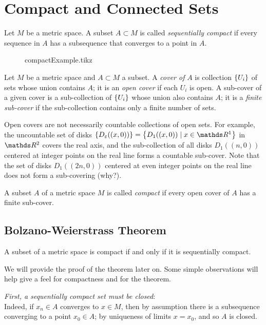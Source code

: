 \documentclass[../main-sheet.tex]{subfiles}
\begin{document}
\chapter{Compact and Connected Sets}
\begin{defn}
    Let $ M $ be a metric space. A subset $ A\subset M $ is called \emph{sequentially compact} if every sequence in $ A $ has a subsequence that converges to a point in $ A $.
\end{defn}
\begin{figure}[H]
    \centering
    {compactExample.tikz}
\end{figure}
\begin{defn}
    Let $ M $ be a metric space and $ A\subset M $ a subset. A \emph{cover of } $ A $ is collection $ \left\{U_i\right\} $ of sets whose union contains $ A $; it is an \emph{open cover} if each $ U_i $ is open. A sub-cover of a given cover is a sub-collection of $ \left\{U_i\right\} $ whose union also contains $ A $; it is a \emph{finite sub-cover} if the sub-collection contains only a finite number of sets.
\end{defn}

Open covers are not necessarily countable collections of open sets. For example, the uncountable set of disks $ \set{D_{\varepsilon}((x,0))}=\set{D_1((x,0))\mid x\in\R^1} $ in $ \R^2 $ covers the real axis, and the sub-collection of all disks $ D_1((n,0)) $ centered at integer points on the real line forms a countable sub-cover. Note that the set of disks $ D_1((2n,0)) $ centered at even integer points on the real line does not form a sub-covering (why?).
\begin{defn}
    A subset $ A $ of a metric space $ M $ is called \emph{compact} if every open cover of $ A $ has a finite sub-cover.
\end{defn}
\section{Bolzano-Weierstrass  Theorem}
\begin{thm}
    A subset of a metric space is compact if and only if it is sequentially compact.
\end{thm}
We will provide the proof of the theorem later on. Some simple observations will help give a feel for compactness and for the theorem.\par

\emph{First, a sequentially compact set must be closed}:\\
Indeed, if $ x_n\in A $ converges to $ x\in M $, then by assumption there is a subsequence converging to a point $ x_0\in A $; by uniqueness of limits $ x=x_0 $, and so $ A $ is closed.\par
\end{document}
